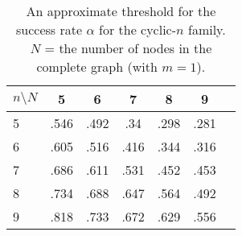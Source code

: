 \begin{table}[h]
\centering
\begin{tabular}{l||c|c|c|c|c|c|}$n\setminus N$&
5&
6&
7&
8&9\\ \hline
5&
.546&
.492&
.34&
.298&
.281\\
6&
.605&
.516&
.416&
.344&
.316\\
7&
.686&
.611&
.531&
.452&
.453\\
8&
.734&
.688&
.647&
.564&
.492\\
9&
.818&
.733&
.672&
.629&
.556\\
\end{tabular}\caption{
An approximate threshold for the success rate $\alpha$ for the cyclic-$n$ family.\\ 
$N$ = the number of nodes in the complete graph (with $m=1$).
}\label{table:alpha-threshold-cyclic}
\end{table}